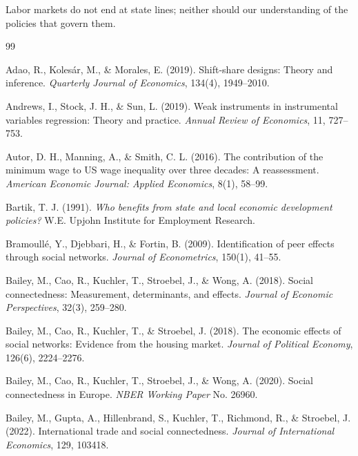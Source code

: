 \documentclass[12pt]{article}
\begin{document}
Labor markets do not end at state lines; neither should our understanding of the policies that govern them.

\label{apep_main_text_end}

\newpage

\begin{thebibliography}{99}

Adao, R., Koles{\'a}r, M., \& Morales, E. (2019).
Shift-share designs: Theory and inference.
\textit{Quarterly Journal of Economics}, 134(4), 1949--2010.

Andrews, I., Stock, J. H., \& Sun, L. (2019).
Weak instruments in instrumental variables regression: Theory and practice.
\textit{Annual Review of Economics}, 11, 727--753.

Autor, D. H., Manning, A., \& Smith, C. L. (2016).
The contribution of the minimum wage to US wage inequality over three decades: A reassessment.
\textit{American Economic Journal: Applied Economics}, 8(1), 58--99.

Bartik, T. J. (1991).
\textit{Who benefits from state and local economic development policies?}
W.E. Upjohn Institute for Employment Research.

Bramoull{\'e}, Y., Djebbari, H., \& Fortin, B. (2009).
Identification of peer effects through social networks.
\textit{Journal of Econometrics}, 150(1), 41--55.

Bailey, M., Cao, R., Kuchler, T., Stroebel, J., \& Wong, A. (2018).
Social connectedness: Measurement, determinants, and effects.
\textit{Journal of Economic Perspectives}, 32(3), 259--280.

Bailey, M., Cao, R., Kuchler, T., \& Stroebel, J. (2018).
The economic effects of social networks: Evidence from the housing market.
\textit{Journal of Political Economy}, 126(6), 2224--2276.

Bailey, M., Cao, R., Kuchler, T., Stroebel, J., \& Wong, A. (2020).
Social connectedness in Europe.
\textit{NBER Working Paper} No. 26960.

Bailey, M., Gupta, A., Hillenbrand, S., Kuchler, T., Richmond, R., \& Stroebel, J. (2022).
International trade and social connectedness.
\textit{Journal of International Economics}, 129, 103418.


\end{thebibliography}
\end{document}
